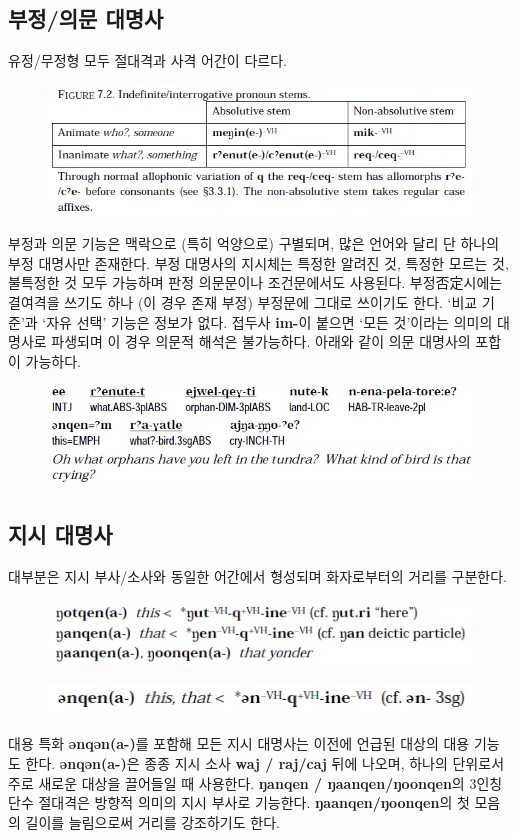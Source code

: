 \subsection{부정/의문 대명사}
유정/무정형 모두 절대격과 사격 어간이 다르다.
\begin{figure}[H]
\centerline{\includegraphics{Chukchi/src/chii.png}}
\end{figure}
부정과 의문 기능은 맥락으로 (특히 억양으로) 구별되며, 많은 언어와 달리 단 하나의 부정 대명사만 존재한다. 부정 대명사의 지시체는 특정한 알려진 것, 특정한 모르는 것, 불특정한 것 모두 가능하며 판정 의문문이나 조건문에서도 사용된다. 부정否定시에는 결여격을 쓰기도 하나 (이 경우 존재 부정) 부정문에 그대로 쓰이기도 한다. `비교 기준'과 `자유 선택' 기능은 정보가 없다. 접두사 \textbf{im-}이 붙으면 `모든 것'이라는 의미의 대명사로 파생되며 이 경우 의문적 해석은 불가능하다. 아래와 같이 의문 대명사의 포합이 가능하다.
\begin{figure}[H]
\centerline{\includegraphics{Chukchi/src/chqi.png}}
\end{figure}
\subsection{지시 대명사}
대부분은 지시 부사/소사와 동일한 어간에서 형성되며 화자로부터의 거리를 구분한다.
\begin{figure}[H]
\centerline{\includegraphics{Chukchi/src/chde.png}}
\end{figure}
\begin{figure}[H]
\centerline{\includegraphics{Chukchi/src/chan.png}}
\end{figure}
대용 특화 \textbf{ənqən(a-)}를 포함해 모든 지시 대명사는 이전에 언급된 대상의 대용 기능도 한다. \textbf{ənqən(a-)}은 종종 지시 소사 \textbf{waj / raj/caj} 뒤에 나오며, 하나의 단위로서 주로 새로운 대상을 끌어들일 때 사용한다. \textbf{ŋanqen / ŋaanqen/ŋoonqen}의 3인칭 단수 절대격은 방향적 의미의 지시 부사로 기능한다. \textbf{ŋaanqen/ŋoonqen}의 첫 모음의 길이를 늘림으로써 거리를 강조하기도 한다.
